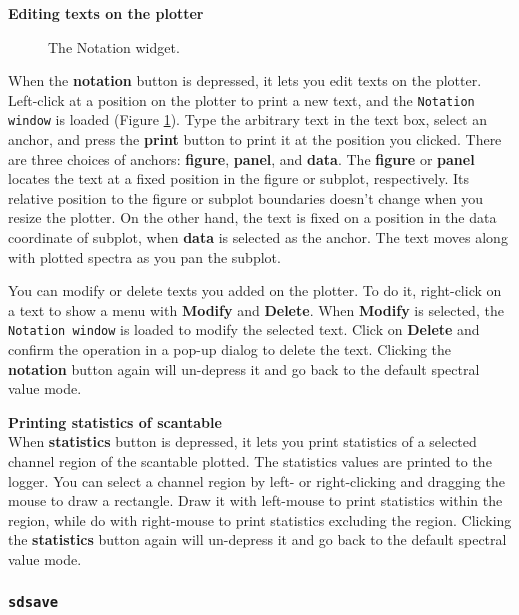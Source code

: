 {\bf Editing texts on the plotter}\\
\begin{figure}[h!]
\begin{center}
\caption{\label{fig:notationwin} The Notation widget.}
\hrulefill
\end{center}
\end{figure}

When the {\bf notation} button is depressed, 
it lets you edit texts on the plotter. 
Left-click at a position on the plotter to print a new text,
and the {\tt Notation window} is loaded (Figure \ref{fig:notationwin}).
Type the arbitrary text in the text box, select an anchor, and press 
the {\bf print} button to print it at the position you clicked.
There are three choices of anchors: {\bf figure}, 
{\bf panel}, and {\bf data}. 
The {\bf figure} or {\bf panel} locates the text at a fixed position 
in the figure or subplot, respectively. Its relative position to 
the figure or subplot boundaries doesn't change when you resize the plotter.
On the other hand, the text is fixed on a position in the data coordinate 
of subplot, when {\bf data} is selected as the anchor. 
The text moves along with plotted spectra as you pan the subplot.

You can modify or delete texts you added on the plotter. 
To do it, right-click on a text to show a menu with 
{\bf Modify} and {\bf Delete}. 
When {\bf Modify} is selected, the {\tt Notation window} is loaded
to modify the selected text. 
Click on {\bf Delete} and confirm the operation in a pop-up dialog 
to delete the text.
Clicking the {\bf notation} button again will un-depress it and go back 
to the default spectral value mode.


{\bf Printing statistics of scantable}\\
When {\bf statistics} button is depressed, 
it lets you print statistics of a selected channel region 
of the scantable plotted. 
The statistics values are printed to the logger.
You can select a channel region by left- or right-clicking and 
dragging the mouse to draw a rectangle. 
Draw it with left-mouse to print statistics within the region,
while do with right-mouse to print statistics excluding the region.
Clicking the {\bf statistics} button again will un-depress it and go back 
to the default spectral value mode.




\subsubsection{{\tt sdsave}}
\label{section:sd.sdtasks.tasks.sdsave}

